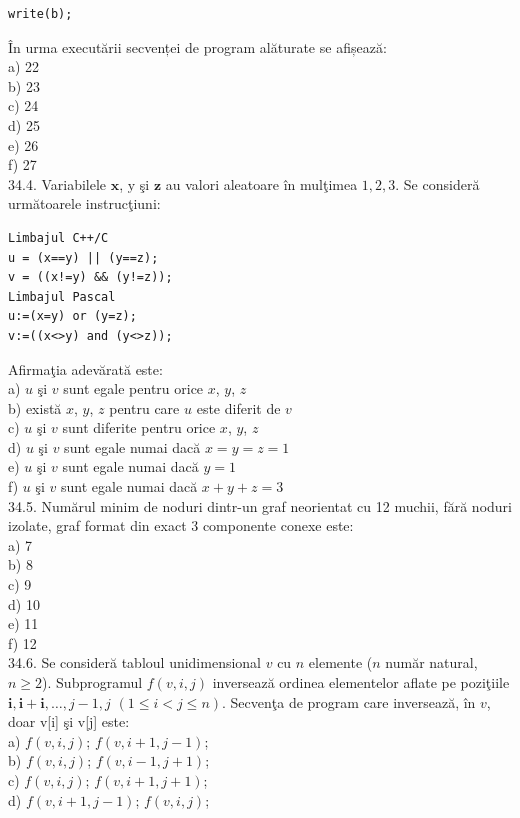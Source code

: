 \begin{itemize}
\begin{enumerate}
\begin{verbatim}
write(b);
\end{verbatim}
În urma executării secvenței de program alăturate se afișează:
\\
a) 22
\\
b) 23
\\
c) 24
\\
d) 25
\\
e) 26
\\
f) 27
\\
34.4. Variabilele $\mathbf{x}$, $\mathrm{y}$ şi $\mathbf{z}$ au valori aleatoare în mulţimea ${1,2,3}$. Se consideră următoarele instrucţiuni:
\begin{verbatim}
Limbajul C++/C
u = (x==y) || (y==z);
v = ((x!=y) && (y!=z));
Limbajul Pascal
u:=(x=y) or (y=z);
v:=((x<>y) and (y<>z));
\end{verbatim}
Afirmaţia adevărată este:
\\
a) $u$ şi $v$ sunt egale pentru orice $x$, $y$, $z$
\\
b) există $x$, $y$, $z$ pentru care $u$ este diferit de $v$
\\
c) $u$ şi $v$ sunt diferite pentru orice $x$, $y$, $z$
\\
d) $u$ şi $v$ sunt egale numai dacă $x=y=z=1$
\\
e) $u$ şi $v$ sunt egale numai dacă $y=1$
\\
f) $u$ şi $v$ sunt egale numai dacă $x+y+z=3$
\\
34.5. Numărul minim de noduri dintr-un graf neorientat cu 12 muchii, fără noduri izolate, graf format din exact 3 componente conexe este:
\\
a) 7
\\
b) 8
\\
c) 9
\\
d) 10
\\
e) 11
\\
f) 12
\\
34.6. Se consideră tabloul unidimensional $v$ cu $n$ elemente ($n$ număr natural, $n \geq 2$). Subprogramul $f(v,i,j)$ inversează ordinea elementelor aflate pe poziţiile $\mathbf{i}, \mathbf{i + i}, \ldots, j-1, j$ $(1 \leq i<j \leq n)$. Secvenţa de program care inversează, în $v$, doar v[i] şi v[j] este:
\\
a) $f(v, i, j)$; $f(v, i+1, j-1)$;
\\
b) $f(v, i, j)$; $f(v, i-1, j+1)$;
\\
c) $f(v, i, j)$; $f(v, i+1, j+1)$;
\\
d) $f(v, i+1, j-1)$; $f(v, i, j)$;
\\

\end{enumerate}
\end{itemize}
